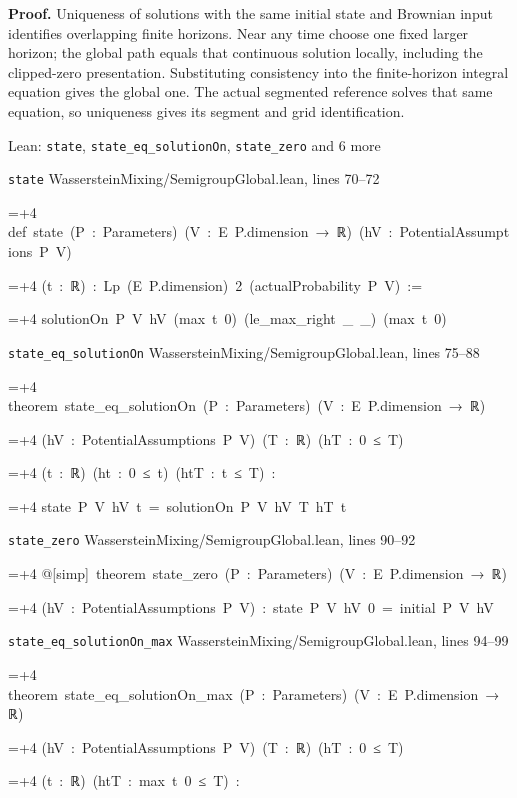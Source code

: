 \documentclass[11pt,a4paper]{report}
\newlength{\leancharwidth}
\newenvironment{leancode}{\par\smallskip\begingroup\ttfamily\footnotesize\raggedright
  \settowidth{\leancharwidth}{M}\setlength{\parskip}{0pt}\setlength{\parindent}{0pt}
  \frenchspacing}{\par\endgroup\smallskip}
\newcommand{\leanline}[2]{\hangindent=\dimexpr#1\leancharwidth+4\leancharwidth\relax
  \hangafter=1\noindent\hspace*{#1\leancharwidth}#2\par}
\newcommand{\leansource}[1]{\par{\footnotesize\color{leanmuted}#1}\par}
\begin{document}
\textbf{Proof.} Uniqueness of solutions with the same initial state and Brownian input identifies overlapping finite horizons. Near any time choose one fixed larger horizon; the global path equals that continuous solution locally, including the clipped-zero presentation. Substituting consistency into the finite-horizon integral equation gives the global one. The actual segmented reference solves that same equation, so uniqueness gives its segment and grid identification.

\begin{leanbox}{Lean: \texttt{state}, \texttt{state\_\allowbreak{}eq\_\allowbreak{}solutionOn}, \texttt{state\_\allowbreak{}zero} and 6 more}
\leansource{\texttt{state} \quad WassersteinMixing/\allowbreak{}SemigroupGlobal.lean, lines 70–72}
\begin{leancode}
\leanline{0}{def\ state\ (P\ :\ Parameters)\ (V\ :\ E\ P.dimension\ →\ ℝ)\ (hV\ :\ PotentialAssumptions\ P\ V)}
\leanline{4}{(t\ :\ ℝ)\ :\ Lp\ (E\ P.dimension)\ 2\ (actualProbability\ P\ V)\ :=}
\leanline{2}{solutionOn\ P\ V\ hV\ (max\ t\ 0)\ (le\_max\_right\ \_\ \_)\ (max\ t\ 0)}
\end{leancode}
\leansource{\texttt{state\_\allowbreak{}eq\_\allowbreak{}solutionOn} \quad WassersteinMixing/\allowbreak{}SemigroupGlobal.lean, lines 75–88}
\begin{leancode}
\leanline{0}{theorem\ state\_eq\_solutionOn\ (P\ :\ Parameters)\ (V\ :\ E\ P.dimension\ →\ ℝ)}
\leanline{4}{(hV\ :\ PotentialAssumptions\ P\ V)\ (T\ :\ ℝ)\ (hT\ :\ 0\ ≤\ T)}
\leanline{4}{(t\ :\ ℝ)\ (ht\ :\ 0\ ≤\ t)\ (htT\ :\ t\ ≤\ T)\ :}
\leanline{4}{state\ P\ V\ hV\ t\ =\ solutionOn\ P\ V\ hV\ T\ hT\ t}
\end{leancode}
\leansource{\texttt{state\_\allowbreak{}zero} \quad WassersteinMixing/\allowbreak{}SemigroupGlobal.lean, lines 90–92}
\begin{leancode}
\leanline{0}{@[simp]\ theorem\ state\_zero\ (P\ :\ Parameters)\ (V\ :\ E\ P.dimension\ →\ ℝ)}
\leanline{4}{(hV\ :\ PotentialAssumptions\ P\ V)\ :\ state\ P\ V\ hV\ 0\ =\ initial\ P\ V\ hV}
\end{leancode}
\leansource{\texttt{state\_\allowbreak{}eq\_\allowbreak{}solutionOn\_\allowbreak{}max} \quad WassersteinMixing/\allowbreak{}SemigroupGlobal.lean, lines 94–99}
\begin{leancode}
\leanline{0}{theorem\ state\_eq\_solutionOn\_max\ (P\ :\ Parameters)\ (V\ :\ E\ P.dimension\ →\ ℝ)}
\leanline{4}{(hV\ :\ PotentialAssumptions\ P\ V)\ (T\ :\ ℝ)\ (hT\ :\ 0\ ≤\ T)}
\leanline{4}{(t\ :\ ℝ)\ (htT\ :\ max\ t\ 0\ ≤\ T)\ :}

\end{leancode}
\end{leanbox}
\end{document}
